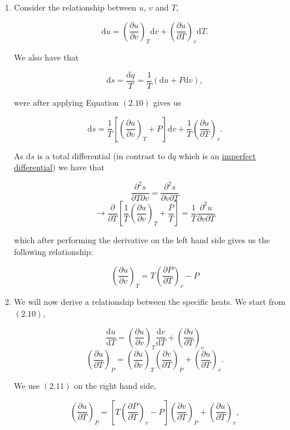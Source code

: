 \documentclass[twocolumn]{article}
\begin{document}
\begin{enumerate}
\def\labelenumi{\arabic{enumi}.}
\item
  Consider the relationship between \(u\), \(v\) and \(T\),

  \[\mathrm{d}u = \left(\frac{\partial u}{\partial v}\right)_T \mathrm{d}v + \left(\frac{\partial u}{\partial T}\right)_v\mathrm{d}T.\tag{2.10}\]

  We also have that

  \[\mathrm{d}s=\frac{\mathrm{d}q}{T}=\frac{1}{T}\left(\mathrm{d}u + P\mathrm{d}v\right),\]

  were after applying Equation \((2.10)\) gives us

  \[\mathrm{d}s=\frac{1}{T}\left[\left(\frac{\partial u}{\partial v}\right)_T + P\right]\mathrm{d}v + \frac{1}{T}\left(\frac{\partial u}{\partial T}\right)_v.\]

  As \(\mathrm{d}s\) is a total differential (in contrast to
  \(\mathrm{d}q\) which is an
  \href{https://en.wikipedia.org/wiki/Inexact_differential}{imperfect
  differential}) we have that

  \[\frac{\partial^2 s}{\partial T\partial v}=\frac{\partial^2 s}{\partial v\partial T}\]
  \[\rightarrow \frac{\partial}{\partial T}\left[\frac{1}{T}\left(\frac{\partial u}{\partial v}\right)_T+\frac{P}{T}\right]=\frac{1}{T}\frac{\partial^2 u}{\partial v\partial T}\]

  which after performing the derivative on the left hand side gives us
  the following relationship:

  \[\boxed{\left(\frac{\partial u}{\partial v}\right)_T=T\left(\frac{\partial P}{\partial T}\right)_v-P}\tag{2.11}\]
\item
  We will now derive a relationship between the specific heats. We start
  from \((2.10)\),

  \[\frac{\mathrm{d}u}{\mathrm{d}T}=\left(\frac{\partial u}{\partial v}\right)_T\frac{\mathrm{d} v}{\mathrm{d} T}+\left(\frac{\partial u}{\partial T}\right)_v\]
  \[\left(\frac{\partial u}{\partial T}\right)_P=\left(\frac{\partial u}{\partial v}\right)_T\left(\frac{\partial v}{\partial T}\right)_P+\left(\frac{\partial u}{\partial T}\right)_v.\]

  We use \((2.11)\) on the right hand side,

  \[\left(\frac{\partial u}{\partial T}\right)_P=\left[T\left(\frac{\partial P}{\partial T}\right)_v-P\right]\left(\frac{\partial v}{\partial T}\right)_P + \left(\frac{\partial u}{\partial T}\right)_v,\]


\end{enumerate}
\end{document}
